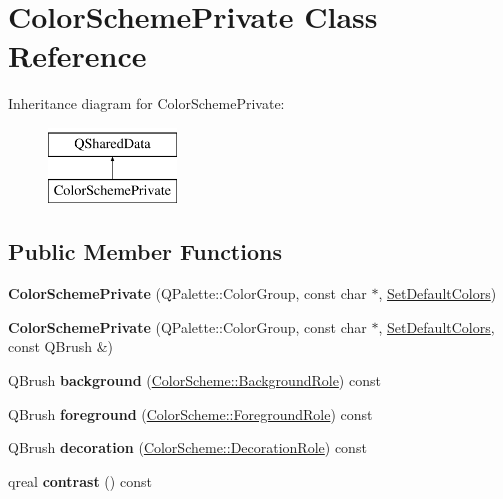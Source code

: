\hypertarget{class_color_scheme_private}{}\section{Color\+Scheme\+Private Class Reference}
\label{class_color_scheme_private}
Inheritance diagram for Color\+Scheme\+Private\+:\begin{figure}[H]
\begin{center}
\leavevmode
\includegraphics[height=2.000000cm]{class_color_scheme_private}
\end{center}
\end{figure}
\subsection*{Public Member Functions}
\begin{DoxyCompactItemize}
\item 
\mbox{\label{class_color_scheme_private_ab4e8ab9923424ce596030577caafd02e}} 
{\bfseries Color\+Scheme\+Private} (Q\+Palette\+::\+Color\+Group, const char $\ast$, \hyperlink{struct_set_default_colors}{Set\+Default\+Colors})
\item 
\mbox{\label{class_color_scheme_private_ac544e0d4cc7480ec4fe5bcebd86703ea}} 
{\bfseries Color\+Scheme\+Private} (Q\+Palette\+::\+Color\+Group, const char $\ast$, \hyperlink{struct_set_default_colors}{Set\+Default\+Colors}, const Q\+Brush \&)
\item 
\mbox{\label{class_color_scheme_private_a2b61c4e6bc15af618c3d8687227612ab}} 
Q\+Brush {\bfseries background} (\hyperlink{class_color_scheme_a70715e73df1fb0f140797633f8043a8c}{Color\+Scheme\+::\+Background\+Role}) const
\item 
\mbox{\label{class_color_scheme_private_af01badb3231921a178535c41b0da00e1}} 
Q\+Brush {\bfseries foreground} (\hyperlink{class_color_scheme_ab0f331e829838e82757088db8ce32ab4}{Color\+Scheme\+::\+Foreground\+Role}) const
\item 
\mbox{\label{class_color_scheme_private_a698ede09de4e6185692ca6ad4dc70ad2}} 
Q\+Brush {\bfseries decoration} (\hyperlink{class_color_scheme_a4ad022af301e30791c6c248e1fc656cf}{Color\+Scheme\+::\+Decoration\+Role}) const
\item 
\mbox{\label{class_color_scheme_private_a750f168e04cd4269bdec785a000f3f69}} 
qreal {\bfseries contrast} () const
\end{DoxyCompactItemize}


